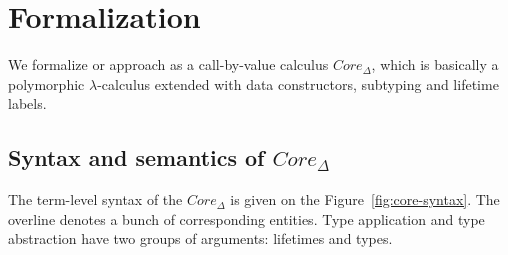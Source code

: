 \documentclass[11pt]{article}
\begin{document}
%
%
%
%

    \clearpage


    \section{Formalization}

    We formalize or approach as a call-by-value calculus $Core_{\Delta}$, which is basically a polymorphic $\lambda$-calculus extended with data constructors, subtyping and lifetime labels.

    \subsection{Syntax and semantics of $Core_\Delta$}

    The term-level syntax of the $Core_\Delta$ is given on the Figure~\ref{fig:core-syntax}.
    The overline denotes a bunch of corresponding entities.
    Type application and type abstraction have two groups of arguments: lifetimes and types.
\end{document}
